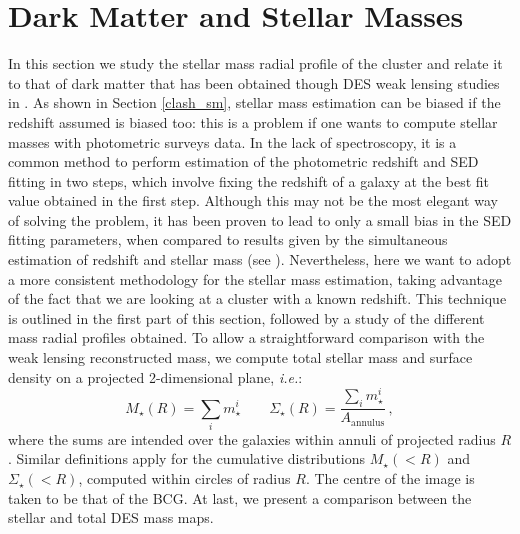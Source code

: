 {\section{Dark Matter and Stellar Masses}\label{DMandSM}
In this section we study the stellar mass radial profile of the cluster and relate it to that of dark matter that has been obtained though DES weak lensing studies in \citet{melchior}. As shown in Section \ref{clash_sm}, stellar mass estimation can be biased if the redshift assumed is biased too: this is a problem if one wants to compute stellar masses with photometric surveys data. In the lack of spectroscopy, it is a common method to perform estimation of the photometric redshift and SED fitting in two steps, which involve fixing the redshift of a galaxy at the best fit value obtained in the first step. Although this may not be the most elegant way of solving the problem, it has been proven to lead to only a small bias in the SED fitting parameters, when compared to results given by the simultaneous estimation of redshift and stellar mass (see \citealt{acquaviva}). Nevertheless, here we want to adopt a more consistent methodology for the stellar mass estimation, taking advantage of the fact that we are looking at a cluster with a known redshift. This technique is outlined in the first part of this section, followed by a study of the different mass radial profiles obtained. To allow a straightforward comparison with the weak lensing reconstructed mass, we compute total stellar mass and surface density on a projected 2-dimensional plane, \emph{i.e.}:
\begin{equation}
M_\star(R)=\sum_i m_\star^i \qquad\Sigma_\star(R)=\frac{\sum_i m_\star^i}{A_\mathrm{annulus}}\, ,
\end{equation}
where the sums are intended over the galaxies within annuli of projected radius $R$. Similar definitions apply for the cumulative distributions $M_\star(<R)$ and $\Sigma_\star(<R)$, computed within circles of radius $R$.  The centre of the image is taken to be that of the BCG. At last, we present a comparison between the stellar and total DES mass maps.


}
